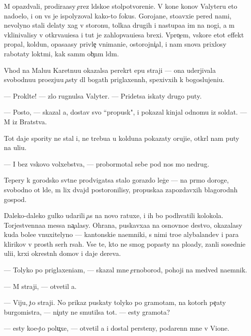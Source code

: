 \documentclass[10pt]{book}
\begin{document}
M{\yi} opazd{\yi}vali, prodira{\y}asy {\c}erez l{\iu}dsko{\y}e stolpotvoreni{\y}e. V kon{\q}e kon{\q}ov Valyteru eto nado{\y}elo, i on vs{\e} je ispolyzoval kako{\y}-to fokus. Gorojane, sto{\y}avxi{\y}e pered nami, nevolyno stali delaty xag v storonu, tolka{\y}a drugih i nastupa{\y}a im na nogi, a m{\yi} vklinivalisy v otkr{\yi}va{\y}u{\x}i{\y}esa i tut je zahlop{\yi}va{\y}u{\x}i{\y}esa brexi. Vpro{\c}em, vskore etot effekt propal, koldun, opasa{\y}asy privle{\c} vnimani{\y}e, ostorojni{\c}al, i nam snova prixlosy rabotaty lokt{\ia}mi, kak sam{\yi}m ob{\yi}{\c}n{\yi}m l{\iu}d{\ia}m.

V{\yi}hod na Malu{\y}u Karetnu{\y}u okazalsa perekr{\yi}t {\q}ep{\y}u straji — ona uderjivala svobodnu{\y}u pro{\y}ezju{\y}u {\c}asty dl{\ia} bogat{\yi}h priglaxenn{\yi}h, spexivxih k bogoslujeni{\y}u.

— Prokl{\ia}t{\y}e! — zlo rugnulsa Valyter. — Pridetsa iskaty drugo{\y} puty.

— Posto{\y}, — skazal {\y}a, dostav svo{\y} ``propusk", i pokazal kinjal odnomu iz soldat. — M{\yi} iz Bratstva.

Tot daje spority ne stal i, ne trebu{\y}a u kolduna pokazaty oruji{\y}e, otkr{\yi}l nam puty na uli{\q}u.

— I bez vs{\ia}kovo volxebstva, — probormotal sebe pod nos mo{\y} nedrug.

Tepery k gorodsko{\y} sv{\ia}t{\yi}ne prodvigatsa stalo gorazdo leg{\c}e — na pr{\ia}mo{\y} doroge, svobodno{\y} ot l{\iu}de{\y}, m{\yi} lix dvajd{\yi} postoronilisy, propuska{\y}a zapozdavxih blagorodn{\yi}h gospod.

Daleko-daleko gulko udarili {\c}as{\yi} na novo{\y} ratuxe, i ih bo{\y} podhvatili kolokola. Torjestvenna{\y}a messa na{\c}alasy. Ohrana, puskavxa{\y}a na osnovno{\y}e de{\y}stvo, okazalasy kuda bole{\y}e vnuxitelyno{\y} — kantonski{\y}e na{\y}emniki, s nimi tro{\y}e alybaland{\q}ev i para klirikov v prost{\yi}h ser{\yi}h r{\ia}sah. Vse te, kto ne smog popasty na plo{\x}ady, zan{\ia}li sosedni{\y}e uli{\q}i, kr{\yi}xi okrestn{\yi}h domov i daje derev{\y}a.

— Tolyko po priglaxeni{\y}am, — skazal mne {\c}ernoborod{\yi}{\y}, pohoji{\y} na medved{\ia} na{\y}emnik.

— M{\yi} straji, — otvetil {\y}a.

— Viju, {\c}to straji. No prikaz puskaty tolyko po gramotam, na kotor{\yi}h pe{\c}aty burgomistra, — ni{\c}uty ne smutilsa tot. — {\Y}esty gramota?

— {\Y}esty ko{\y}e-{\c}to polu{\c}xe, — otvetil {\y}a i dostal persteny, podarenn{\yi}{\y} mne v Vione.
\end{document}
